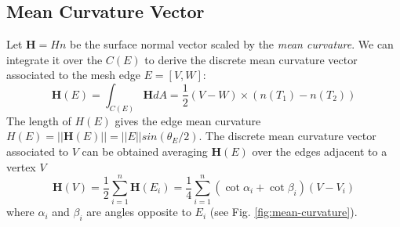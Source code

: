 \subsection{Mean Curvature Vector}
Let $\bm{H} = H n$ be the surface normal vector scaled by the \textit{mean curvature}. We can integrate it over the $C(E)$ to derive the discrete mean curvature vector associated to the mesh edge $E=[V, W]$:
$$ \bm{H}(E) = \int_{C(E)} \bm{H}dA = \frac{1}{2} (V-W) \times (n(T_1) - n(T_2))$$
The length of $H(E)$ gives the edge mean curvature $H(E) = ||\bm{H}(E) || = ||E|| sin(\theta_E/2)$. The discrete mean curvature vector associated to $V$ can be obtained averaging $\bm{H}(E)$ over the edges adjacent to a vertex $V$
$$\bm{H}(V) = \frac{1}{2} \sum_{i=1}^{n} \bm{H}(E_i) = \frac{1}{4}\sum_{i=1}^n (\cot \alpha_i + \cot \beta_i)(V - V_i)$$
where $\alpha_i$ and $\beta_i$ are angles opposite to $E_i$ (see Fig. \ref{fig:mean-curvature}).
\cite{geometryprocessing}
